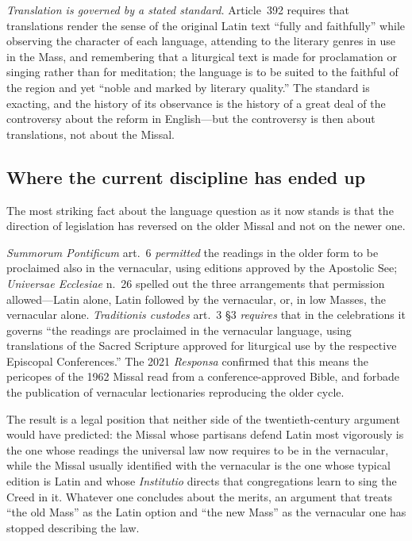 \emph{Translation is governed by a stated standard.} Article~392 requires that translations render the sense of the original Latin text ``fully and faithfully'' while observing the character of each language, attending to the literary genres in use in the Mass, and remembering that a liturgical text is made for proclamation or singing rather than for meditation; the language is to be suited to the faithful of the region and yet ``noble and marked by literary quality.'' The standard is exacting, and the history of its observance is the history of a great deal of the controversy about the reform in English---but the controversy is then about translations, not about the Missal.

\subsection{Where the current discipline has ended up}

The most striking fact about the language question as it now stands is that the direction of legislation has reversed on the older Missal and not on the newer one.

\emph{Summorum Pontificum} art.~6 \emph{permitted} the readings in the older form to be proclaimed also in the vernacular, using editions approved by the Apostolic See; \emph{Universae Ecclesiae} n.~26 spelled out the three arrangements that permission allowed---Latin alone, Latin followed by the vernacular, or, in low Masses, the vernacular alone. \emph{Traditionis custodes} art.~3 \S 3 \emph{requires} that in the celebrations it governs ``the readings are proclaimed in the vernacular language, using translations of the Sacred Scripture approved for liturgical use by the respective Episcopal Conferences.'' The 2021 \emph{Responsa} confirmed that this means the pericopes of the 1962 Missal read from a conference-approved Bible, and forbade the publication of vernacular lectionaries reproducing the older cycle.

The result is a legal position that neither side of the twentieth-century argument would have predicted: the Missal whose partisans defend Latin most vigorously is the one whose readings the universal law now requires to be in the vernacular, while the Missal usually identified with the vernacular is the one whose typical edition is Latin and whose \emph{Institutio} directs that congregations learn to sing the Creed in it. Whatever one concludes about the merits, an argument that treats ``the old Mass'' as the Latin option and ``the new Mass'' as the vernacular one has stopped describing the law.

